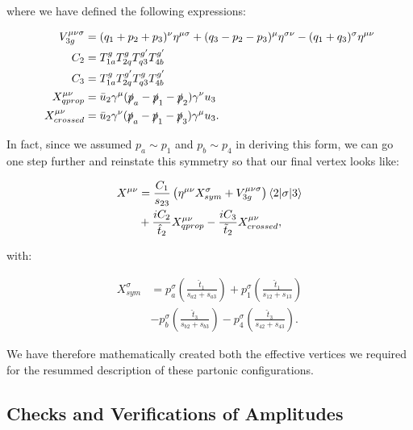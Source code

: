 where we have defined the following expressions:

\begin{subequations}
\begin{align}
V_{3g}^{\mu \nu \sigma} &= (q_1 + p_2 + p_3)^\nu \eta^{\mu \sigma} + (q_3 - p_2 -p_3)^\mu \eta^{\sigma \nu} - (q_1 + q_3)^\sigma \eta^{\mu \nu} \\
C_2 &= T^g_{1a}T^g_{2q}T^{g'}_{q3}T^{g'}_{4b} \\
C_3 &= T^g_{1a}T^{g'}_{2q}T^g_{q3}T^{g'}_{4b} \\
X_{qprop}^{\mu \nu} &= \bar{u}_2 \gamma^\mu (\slashed{p}_a - \slashed{p}_1 - \slashed{p}_2)\gamma^\nu u_3 \\
X_{crossed}^{\mu \nu} &=\bar{u}_2 \gamma^\nu (\slashed{p}_a - \slashed{p}_1 - \slashed{p}_3)\gamma^\mu u_3.
\end{align}
\end{subequations}

In fact, since we assumed $p_a \sim p_1$ and $p_b \sim p_4$ in deriving this form, we can go one step further and reinstate this symmetry so that our final vertex looks like:

\begin{equation}
\begin{split}
X^{\mu \nu} &= \frac{C_1}{s_{23}} \left(\eta^{\mu \nu} X_{sym}^\sigma + V^{\mu \nu \sigma}_{3g} \right) \mathinner{\langle2\vert\sigma\vert3\rangle}_{} \\
&+ \frac{i C_2}{\hat{t}_2} X^{\mu \nu}_{qprop} - \frac{i C_3}{\tilde{t}_2} X^{\mu \nu}_{crossed},
\end{split}
\end{equation}

with:

\begin{equation}
\begin{split}
X_{sym}^\sigma &= p_a^\sigma \left( \frac{\hat{t}_1}{s_{a2}+s_{a3}} \right) + p_1^\sigma \left( \frac{\hat{t}_1}{s_{12}+s_{13}} \right) \\
&- p_b^\sigma \left( \frac{\hat{t}_3}{s_{b2}+s_{b3}} \right) - p_4^\sigma \left( \frac{\hat{t}_3}{s_{42}+s_{43}} \right).
\end{split}
\end{equation}

We have therefore mathematically created both the effective vertices we required for the resummed description of these partonic configurations. 

\subsection{Checks and Verifications of Amplitudes}

